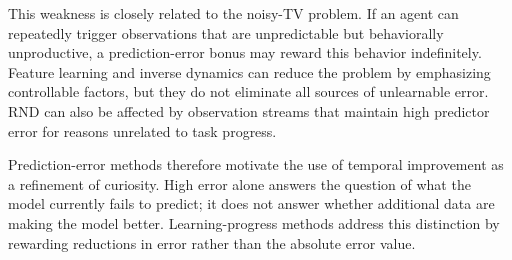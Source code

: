 This weakness is closely related to the noisy-TV problem.
If an agent can repeatedly trigger observations that are unpredictable but behaviorally unproductive, a prediction-error bonus may reward this behavior indefinitely.
Feature learning and inverse dynamics can reduce the problem by emphasizing controllable factors, but they do not eliminate all sources of unlearnable error.
RND can also be affected by observation streams that maintain high predictor error for reasons unrelated to task progress.

Prediction-error methods therefore motivate the use of temporal improvement as a refinement of curiosity.
High error alone answers the question of what the model currently fails to predict; it does not answer whether additional data are making the model better.
Learning-progress methods address this distinction by rewarding reductions in error rather than the absolute error value.